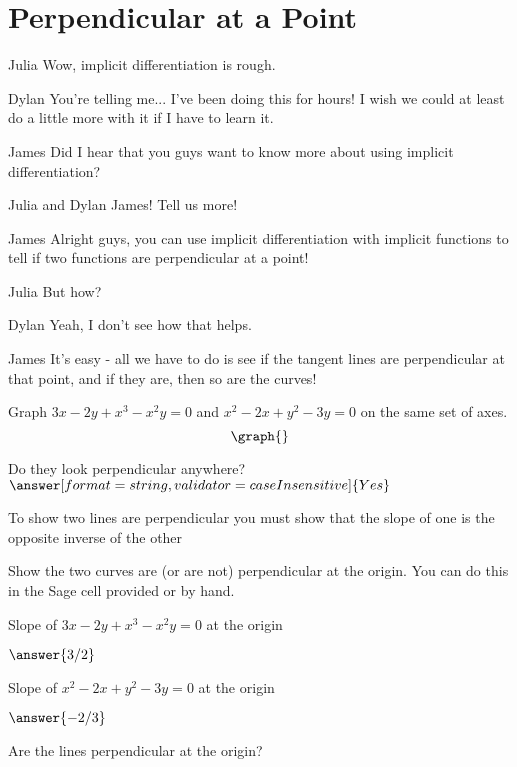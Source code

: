 \documentclass{ximera}
\begin{document}
\section{Perpendicular at a Point}
\begin{dialogue}
\item[Julia] Wow, implicit differentiation is rough.
\item[Dylan] You're telling me... I've been doing this for hours! I wish we could at least do a little more with it if I have to learn it.
\item[James] Did I hear that you guys want to know more about using implicit differentiation?
\item[Julia and Dylan] James! Tell us more!
\item[James] Alright guys, you can use implicit differentiation with implicit functions to tell if two functions are perpendicular at a point!
\item[Julia] But how?
\item[Dylan] Yeah, I don't see how that helps.
\item[James] It's easy - all we have to do is see if the tangent lines are perpendicular at that point, and if they are, then so are the curves!
\end{dialogue}
\begin{question}
Graph $3x - 2y + x^3-x^2y = 0$ and $x^2 - 2x + y^2 - 3y = 0$ on the same set of axes.
\[
\graph{}
\]

Do they look perpendicular anywhere?
$\answer[format=string,validator=caseInsensitive]{Yes}$
\end{question}
\begin{question}
\begin{hint}
To show two lines are perpendicular you must show that the slope of one is the opposite inverse of the other
\end{hint}
Show the two curves are (or are not) perpendicular at the origin. You can do this in the Sage cell provided or by hand.
\begin{onlineOnly}
\begin{sageCell}

\end{sageCell}
\end{onlineOnly}
Slope of $3x - 2y + x^3-x^2y = 0$ at the origin 

$\answer{3/2}$

Slope of $x^2 - 2x + y^2 - 3y = 0$ at the origin 

$\answer{-2/3}$

Are the lines perpendicular at the origin?



\end{question}
\end{document}
